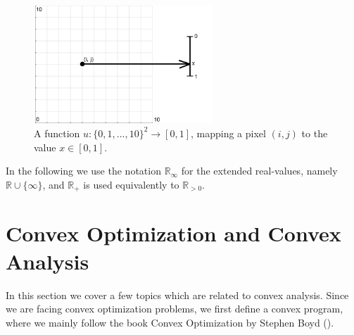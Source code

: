 \documentclass{scrreprt}
\begin{document}
        \begin{figure}[!ht]
            \centering
                \includegraphics[width=0.6\textwidth]{img/image_mapping.png}
            \caption[Mapping of images.]{A function $u: \{0,1,...,10\}^{2} \to [0,1]$, mapping a pixel $(i,j)$ to the value $x \in [0,1]$.}
        \label{fig:image_mapping}
        \end{figure}

        In the following we use the notation $\mathbb{R}_{\infty}$ for the extended real-values, namely $\mathbb{R} \cup \{ \infty \}$, and $\mathbb{R}_{+}$ is used equivalently to $\mathbb{R}_{> 0}$.


    \section{Convex Optimization and Convex Analysis} %
    \label{sec:convex_optimization_and_convex_analysis}

        In this section we cover a few topics which are related to convex analysis. Since we are facing convex optimization problems, we first define a convex program, where we mainly follow the book Convex Optimization by Stephen Boyd (\cite{Boyd}).
\end{document}
